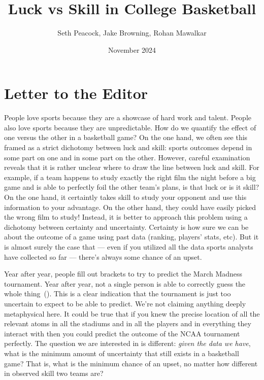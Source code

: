 \documentclass{article}
\title{Luck vs Skill in College Basketball}
\author{Seth Peacock, Jake Browning, Rohan Mawalkar}
\date{November 2024}
\begin{document}
\maketitle

\newpage

\section{Letter to the Editor}

People love sports because they are a showcase of hard work and talent. People also love sports because they are unpredictable. How do we quantify the effect of one versus the other in a basketball game? On the one hand, we often see this framed as a strict dichotomy between luck and skill: sports outcomes depend in some part on one and in some part on the other. However, careful examination reveals that it is rather unclear where to draw the line between luck and skill. For example, if a team happens to study exactly the right film the night before a big game and is able to perfectly foil the other team's plans, is that luck or is it skill? On the one hand, it certaintly takes skill to study your opponent and use this information to your advantage. On the other hand, they could have easily picked the wrong film to study! Instead, it is better to approach this problem using a dichotomy between certainty and uncertainty. Certainty is how sure we can be about the outcome of a game using past data (ranking, players' stats, etc). But it is almost surely the case that --- even if you utilized all the data sports analysts have collected so far --- there's always some chance of an upset.

Year after year, people fill out brackets to try to predict the March Madness tournament. Year after year, not a single person is able to correctly guess the whole thing~(\cite{cbsnewsAnyoneEver}). This is a clear indication that the tournament is just too uncertain to expect to be able to predict. We're not claiming anything deeply metaphysical here. It could be true that if you knew the precise location of all the relevant atoms in all the stadiums and in all the players and in everything they interact with then you could predict the outcome of the NCAA tournament perfectly. The question we are interested in is different: \textit{given the data we have}, what is the minimum amount of uncertainty that still exists in a basketball game? That is, what is the minimum chance of an upset, no matter how different in observed skill two teams are?
\end{document}

